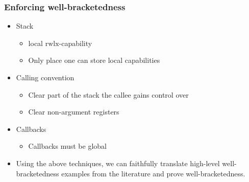 \documentclass[handout]{beamer}
\newcommand{\plainperm}[1]{\mathrm{#1}}
\newcommand{\rwlx}{\plainperm{rwlx}}
\begin{document}
\begin{frame}
  \frametitle{Enforcing well-bracketedness}
  \begin{itemize}
  \item Stack
    \begin{itemize}
    \item local $\rwlx$-capability
    \item Only place one can store local capabilities
    \end{itemize}
  \item Calling convention
    \begin{itemize}
    \item Clear part of the stack the callee gains control over
    \item Clear non-argument registers 
    \end{itemize}
  \item Callbacks
    \begin{itemize}
    \item Callbacks must be global
    \end{itemize}
  \end{itemize}
  \begin{itemize}
  \item Using the above techniques, we can faithfully translate high-level well-bracketedness examples from the literature and prove well-bracketedness.
  \end{itemize}
\end{frame}
\end{document}
